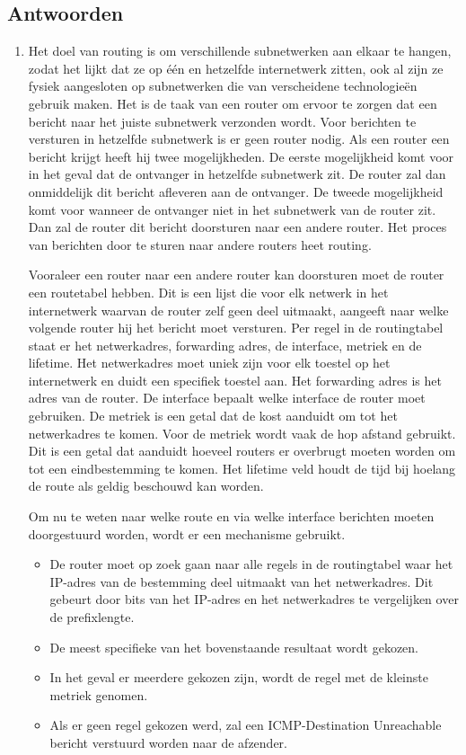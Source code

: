 \documentclass{report}
\begin{document}
\subsection{Antwoorden}
\begin{enumerate}
	\item Het doel van routing is om verschillende subnetwerken aan elkaar te hangen, zodat het lijkt dat ze op één en hetzelfde internetwerk zitten, ook al zijn ze fysiek aangesloten op subnetwerken die van verscheidene technologieën gebruik maken. Het is de taak van een router om ervoor te zorgen dat een bericht naar het juiste subnetwerk verzonden wordt. Voor berichten te versturen in hetzelfde subnetwerk is er geen router nodig. Als een router een bericht krijgt heeft hij twee mogelijkheden. De eerste mogelijkheid komt voor in het geval dat de ontvanger in hetzelfde subnetwerk zit. De router zal dan onmiddelijk dit bericht afleveren aan de ontvanger. De tweede mogelijkheid komt voor wanneer de ontvanger niet in het subnetwerk van de router zit. Dan zal de router dit bericht doorsturen naar een andere router. Het proces van berichten door te sturen naar andere routers heet routing.
	
	
	Vooraleer een router naar een andere router kan doorsturen moet de router een routetabel hebben. Dit is een lijst die voor elk netwerk in het internetwerk waarvan de router zelf geen deel uitmaakt, aangeeft naar welke volgende router hij het bericht moet versturen. Per regel in de routingtabel staat er het netwerkadres, forwarding adres, de interface, metriek en de lifetime. Het netwerkadres moet uniek zijn voor elk toestel op het internetwerk en duidt een specifiek toestel aan. Het forwarding adres is het adres van de router. De interface bepaalt welke interface de router moet gebruiken. De metriek is een getal dat de kost aanduidt om tot het netwerkadres te komen. Voor de metriek wordt vaak de hop afstand gebruikt. Dit is een getal dat aanduidt hoeveel routers er overbrugt moeten worden om tot een eindbestemming te komen. Het lifetime veld houdt de tijd bij hoelang de route als geldig beschouwd kan worden.
	
	Om nu te weten naar welke route en via welke interface berichten moeten doorgestuurd worden, wordt er een mechanisme gebruikt.
	\begin{itemize}
		\item De router moet op zoek gaan naar alle regels in de routingtabel waar het IP-adres van de bestemming deel uitmaakt van het netwerkadres. Dit gebeurt door bits van het IP-adres en het netwerkadres te vergelijken over de prefixlengte. 
		\item De meest specifieke van het bovenstaande resultaat wordt gekozen.
		\item In het geval er meerdere gekozen zijn, wordt de regel met de kleinste metriek genomen.
		\item Als er geen regel gekozen werd, zal een ICMP-Destination Unreachable bericht verstuurd worden naar de afzender.
	\end{itemize}
	

\end{enumerate}
\end{document}

